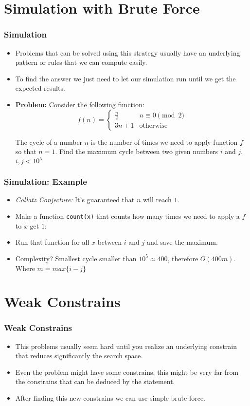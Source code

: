 \documentclass{beamer}
\begin{document}
\section{Simulation with Brute Force}

\begin{frame}
	\frametitle{Simulation}

	\begin{itemize}
		\item Problems that can be solved using this strategy usually have an underlying pattern or rules that we can compute easily.
		\item To find the answer we just need to let our simulation run until we get the expected results.
		\item \textbf{Problem:} Consider the following function:
			$$ f(n) = \begin{cases} \frac{n}{2} & n \equiv 0 \pmod{2}\\
			3n + 1 & \text{otherwise} \end{cases}$$

			The cycle of a number $n$ is the number of times we need to apply function $f$ so that $n = 1$. Find the maximum cycle between two given numbers $i$ and $j$. $i, j < 10^5$
	\end{itemize}
\end{frame}

\begin{frame}
	\frametitle{Simulation: Example}

	\begin{itemize}
		\item \textit{Collatz Conjecture:} It's guaranteed that $n$ will reach $1$.
		\item<2-> Make a function \texttt{count(x)} that counts how many times we need to apply a $f$ to $x$ get $1$:
		\item<3-> Run that function for all $x$ between $i$ and $j$ and save the maximum.
		\item<4-> Complexity? Smallest cycle smaller than $10^{5} \approx 400$, therefore $O(400m)$. Where $m = max\{i - j\}$
	\end{itemize}
\end{frame}

\section{Weak Constrains}

\begin{frame}
	\frametitle{Weak Constrains}

	\begin{itemize}
		\item This problems usually seem hard until you realize an underlying constrain that reduces significantly the search space.
		\item Even the problem might have some constrains, this might be very far from the constrains that can be deduced by the statement.
		\item After finding this new constrains we can use simple brute-force.
	\end{itemize}
\end{frame}
\end{document}
